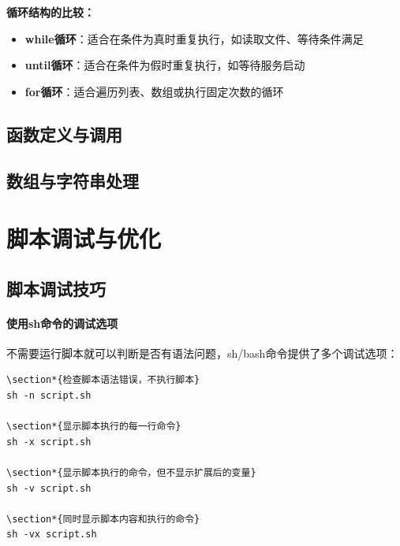 \documentclass[12pt,UTF8]{ctexbook}
\begin{document}
\textbf{循环结构的比较：}
\begin{itemize}
    \item \textbf{while循环}：适合在条件为真时重复执行，如读取文件、等待条件满足
    \item \textbf{until循环}：适合在条件为假时重复执行，如等待服务启动
    \item \textbf{for循环}：适合遍历列表、数组或执行固定次数的循环
\end{itemize}

\subsection{函数定义与调用}
\subsection{数组与字符串处理}

\section{脚本调试与优化}
\subsection{脚本调试技巧}

\paragraph{使用sh命令的调试选项}
不需要运行脚本就可以判断是否有语法问题，sh/bash命令提供了多个调试选项：

\begin{verbatim}
\section*{检查脚本语法错误，不执行脚本}
sh -n script.sh

\section*{显示脚本执行的每一行命令}
sh -x script.sh

\section*{显示脚本执行的命令，但不显示扩展后的变量}
sh -v script.sh

\section*{同时显示脚本内容和执行的命令}
sh -vx script.sh
\end{verbatim}
\end{document}
